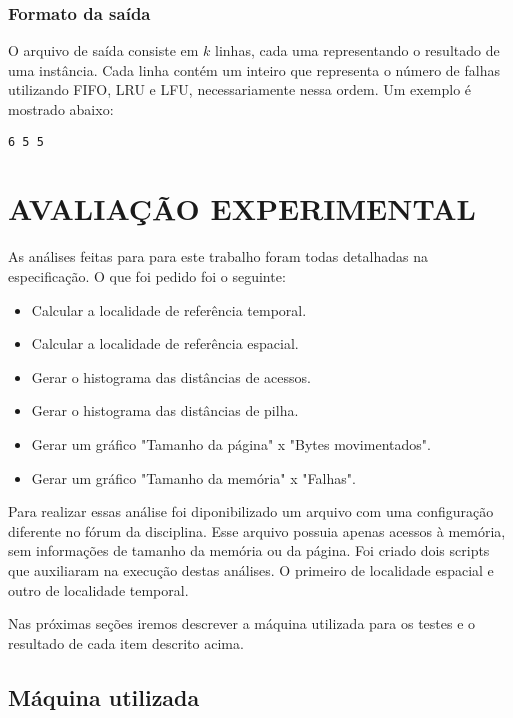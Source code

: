\documentclass[12pt]{article}
\begin{document}
\subsubsection{Formato da saída}
\label{saida}

O arquivo de saída consiste em $k$ linhas, cada uma representando o resultado de uma instância. Cada linha contém um inteiro que representa o número de falhas utilizando FIFO, LRU e LFU, necessariamente nessa ordem. Um exemplo é mostrado abaixo:

\begin{verbatim}
6 5 5
\end{verbatim}


\section{AVALIAÇÃO EXPERIMENTAL}
\label{avaliacao_experimental}

As análises feitas para para este trabalho foram todas detalhadas na especificação. O que foi pedido foi o seguinte:

\begin{itemize}
\item Calcular a localidade de referência temporal.
\item Calcular a localidade de referência espacial.
\item Gerar o histograma das distâncias de acessos.
\item Gerar o histograma das distâncias de pilha.
\item Gerar um gráfico "Tamanho da página" x "Bytes movimentados".
\item Gerar um gráfico "Tamanho da memória" x "Falhas".
\end{itemize}

Para realizar essas análise foi diponibilizado um arquivo com uma configuração diferente no fórum da disciplina. Esse arquivo possuia apenas acessos à memória, sem informações de tamanho da memória ou da página. Foi criado dois scripts que auxiliaram na execução destas análises. O primeiro de localidade espacial e outro de localidade temporal.

Nas próximas seções iremos descrever a máquina utilizada para os testes e o resultado de cada item descrito acima.

\subsection{Máquina utilizada}
\label{maquina}
\end{document}
